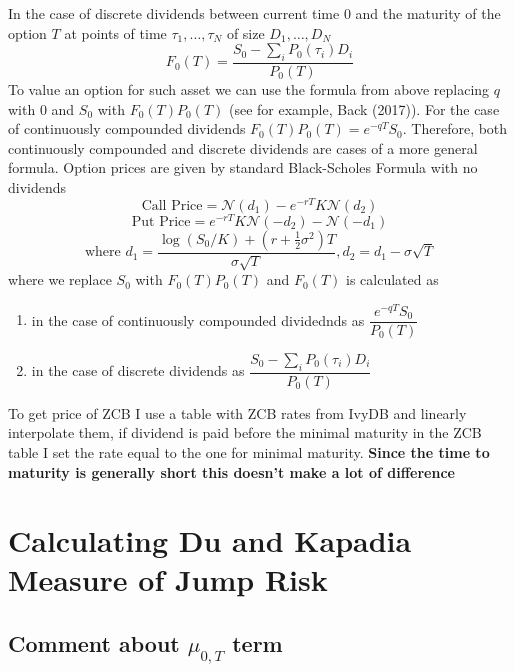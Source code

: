 \documentclass[12pt]{article}
\begin{document}
In the case of discrete dividends between current time $0$ and the maturity of the option $T$ at points of time $\tau_1,\dots, \tau_N$ of size $D_1,\dots, D_N$
\[F_0(T) = \frac{S_0 - \sum_{i}P_0(\tau_{i})D_i}{P_0(T)}\]
To value an option for such asset we can use the formula from above replacing $q$ with $0$ and $S_0$ with $F_0(T)P_0(T)$ (see for example, Back (2017)). For the case of continuously compounded dividends $F_0(T)P_0(T) = e^{-qT}S_0$. Therefore, both continuously compounded and discrete dividends are cases of a more general formula. Option prices are given by standard Black-Scholes Formula with no dividends
\[\text{Call Price} = \mathcal{N}(d_1)-e^{-rT}K\mathcal{N}(d_2)\]
\[\text{Put Price} = e^{-rT}K\mathcal{N}(-d_2) - \mathcal{N}(-d_1)\]
\[\text{where } d_1 = \frac{\log(S_0/K) + (r + \frac{1}{2}\sigma^2)T}{\sigma\sqrt{T}}, d_2 = d_1 - \sigma\sqrt{T}\]
where we replace $S_0$ with $F_0(T)P_0(T)$ and $F_0(T)$ is calculated as
\begin{enumerate}
	\item in the case of continuously compounded dividednds as $\dfrac{e^{-qT}S_0}{P_0(T)}$
	\item in the case of discrete dividends as $\dfrac{S_0 - \sum_{i}P_0(\tau_{i})D_i}{P_0(T)}$
\end{enumerate}

To get price of ZCB I use a table with ZCB rates from IvyDB and linearly interpolate them, if dividend is paid before the minimal maturity in the ZCB table I set the rate equal to the one for minimal maturity. \textbf{\color{red} Since the time to maturity is generally short this doesn't make a lot of difference}


\newpage

\section{Calculating Du and Kapadia Measure of Jump Risk}

\subsection[]{Comment about $\mu_{0,T}$ term}
\end{document}
